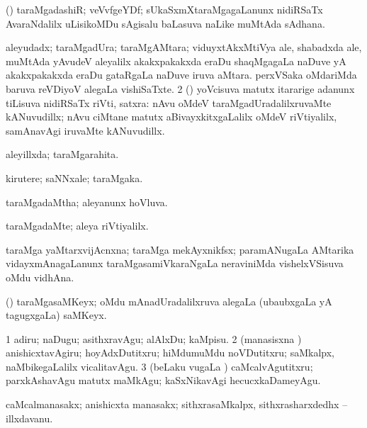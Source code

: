{\bentry
{} 
\gl{\nA}
\expl{}
\bmng
(\viduyx) taraMgadashiR; veVvfgeYDf; sUkaSxmXtaraMgagaLanunx nidiRSaTx AvaraNdalilx uLisikoMDu sAgisalu baLasuva naLike muMtAda sAdhana. 
\emng
\eentry

\bentry
{} 
\gl{\nA}
\expl{}
\bmng
\bnum
{} 
\banum
{} aleyudadx; taraMgadUra; taraMgAMtara; viduyxtAkxMtiVya ale, shabadxda ale, muMtAda yAvudeV aleyalilx akakxpakakxda eraDu shaqMgagaLa naDuve yA akakxpakakxda eraDu gataRgaLa naDuve iruva aMtara. 
 perxVSaka oMdariMda baruva reVDiyoV alegaLa vishiSaTxte. 
\eanum
\numie
\num{2} (\AmA) yoVcisuva matutx itararige adanunx tiLisuva nidiRSaTx riVti, satxra:  nAvu oMdeV taraMgadUradalilxruvaMte kANuvudillx; nAvu ciMtane matutx aBivayxkitxgaLalilx oMdeV riVtiyalilx, samAnavAgi iruvaMte kANuvudillx. 
\enum
\emng
\eentry

\bentry
{} 
\gl{\gu}
\expl{}
\bmng
aleyillxda; taraMgarahita. 
\emng
\eentry

\bentry
{} 
\gl{\nA}
\expl{}
\bmng
kirutere; saNNxale; taraMgaka. 
\emng
\eentry

\bentry
{} 
\gl{\gu}
\expl{}
\bmng
taraMgadaMtha; aleyanunx hoVluva. 
\emng
\eentry

\bentry
{} 
\gl{\kirxvi}
\expl{}
\bmng
taraMgadaMte; aleya riVtiyalilx. 
\emng
\eentry

\bentry
{} 
\gl{\nA}
\expl{}
\bmng
taraMga yaMtarxvijAcnxna; taraMga mekAyxnikfsx; paramANugaLa AMtarika vidayxmAnagaLanunx taraMgasamiVkaraNgaLa neraviniMda vishelxVSisuva oMdu vidhAna. 
\emng
\eentry

\bentry
{} 
\gl{\nA}
\expl{}
\bmng
(\Bwvi) taraMgasaMKeyx; oMdu mAnadUradalilxruva alegaLa (ubaubxgaLa yA tagugxgaLa) saMKeyx. 
\emng
\eentry

\bentry
{} 
\gl{\akirx}
\expl{}
\bmng
\bnum
\num{1} adiru; naDugu; asithxravAgu; alAlxDu; kaMpisu. 
\num{2} (manasisxna \vi) anishicxtavAgiru; hoyAdxDutitxru; hiMdumuMdu noVDutitxru; saMkalpx, naMbikegaLalilx vicalitavAgu. 
\num{3} (beLaku \mo vugaLa \vi) caMcalvAgutitxru; parxkAshavAgu matutx maMkAgu; kaSxNikavAgi hecucxkaDameyAgu. 
\enum
\emng
\eentry

\bentry
{} 
\gl{\nA}
\expl{}
\bmng
caMcalmanasakx; anishicxta manasakx; sithxrasaMkalpx, sithxrasharxdedhx -- illxdavanu. 
\emng
\eentry

}
